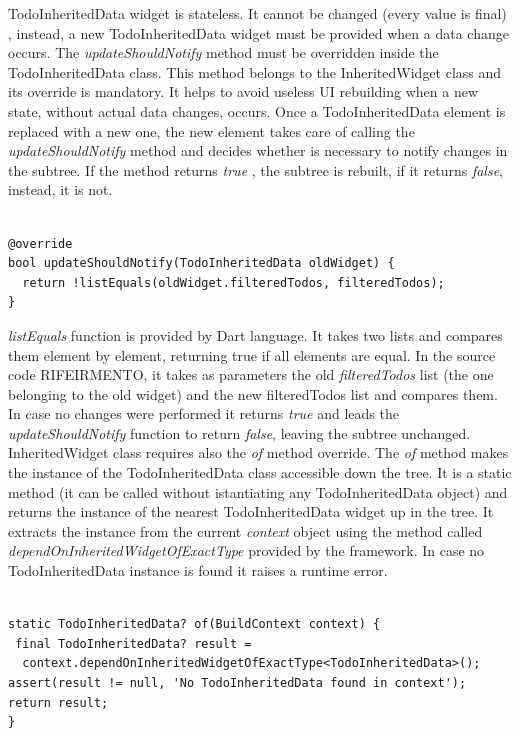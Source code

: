 TodoInheritedData widget is stateless. It cannot be changed (every value is final) , instead, a new TodoInheritedData widget must be provided when a data change occurs. 
The \textit{updateShouldNotify }method must be overridden inside the TodoInheritedData class. This method belongs to the InheritedWidget class and its override is mandatory. It helps to avoid useless UI rebuilding when a new state, without actual data changes, occurs. Once a TodoInheritedData element is replaced with a new one, the new element takes care of calling the \textit{updateShouldNotify }method and decides whether is necessary to notify changes in the subtree. If the method returns \textit{true }, the subtree is rebuilt, if  it returns \textit{false}, instead, it is not.
\mbox{}\\
\begin{code}
 \mbox{}

\label{code:2.16}
\begin{verbatim}

@override
bool updateShouldNotify(TodoInheritedData oldWidget) {
  return !listEquals(oldWidget.filteredTodos, filteredTodos);
}
\end{verbatim}
\end{code}
\mbox{}
\textit{listEquals }function is provided by Dart language. It takes two lists and compares them element by element, returning true if all elements are equal. In the source code RIFEIRMENTO, it takes as parameters the old \textit{filteredTodos} list (the one belonging to the old widget)  and the new filteredTodos list and compares them. In case no changes were performed it returns \textit{true} and leads the \textit{updateShouldNotify }function to return \textit{false}, leaving the subtree unchanged.\\
InheritedWidget class requires also the \textit{of} method override. The \textit{of }method makes the instance of the TodoInheritedData class accessible down the tree. It is a static method (it can be called without istantiating any TodoInheritedData object) and returns the instance of the nearest TodoInheritedData widget up in the tree. It extracts the instance from the current \textit{context} object using the method called \textit{dependOnInheritedWidgetOfExactType} provided by the framework. In case no TodoInheritedData instance is found it raises a runtime error.
\mbox{}
\begin{code}
 \mbox{}
\label{code:2.17}
\begin{verbatim}

static TodoInheritedData? of(BuildContext context) {
 final TodoInheritedData? result =
  context.dependOnInheritedWidgetOfExactType<TodoInheritedData>(); 
assert(result != null, 'No TodoInheritedData found in context');
return result;
}
\end{verbatim}
\end{code}
